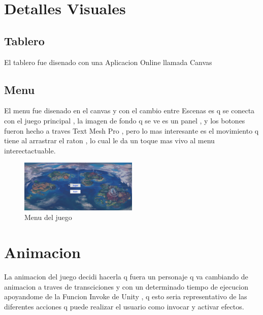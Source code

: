 \documentclass{article}
\begin{document}
\section{Detalles Visuales}
\subsection{Tablero}
El tablero fue disenado con una Aplicacion Online llamada Canvas
\subsection*{Menu}
El menu fue disenado en el canvas y con el cambio entre Escenas es q se conecta con el juego principal , la imagen de fondo q se ve es un panel , y los botones fueron hecho a traves Text Mesh Pro , pero lo mas interesante es el movimiento q tiene al arrastrar el raton , lo cual le da un toque mas vivo al menu interectactuable.
\begin{figure}
\centering
\includegraphics[width =0.5\textwidth]
{3}
\caption{Menu del juego}
\label{fig : a}
\end{figure}
\newpage
\section{Animacion}
La animacion del juego decidi hacerla q fuera un personaje q va cambiando de animacion a traves de transciciones y con un determinado tiempo de ejecucion apoyandome de la Funcion Invoke de Unity , q esto seria representativo de las diferentes acciones q puede realizar el usuario como invocar y activar efectos.
\end{document}

